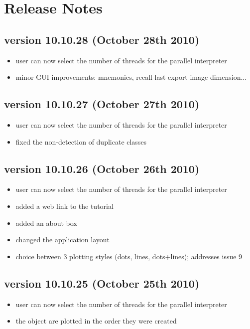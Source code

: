 \section{Release Notes}
\subsection{version 10.10.28 (October 28th 2010)}

\begin{itemize}
    \item user can now select the number of threads for the parallel interpreter
    \item minor GUI improvements: mnemonics, recall last export image dimension... 
\end{itemize}

\subsection{version 10.10.27 (October 27th 2010)}

\begin{itemize}
    \item user can now select the number of threads for the parallel interpreter
    \item fixed the non-detection of duplicate classes 
\end{itemize}

\subsection{version 10.10.26 (October 26th 2010)}

\begin{itemize}
    \item user can now select the number of threads for the parallel interpreter
    \item added a web link to the tutorial
    \item added an about box
    \item changed the application layout
    \item choice between 3 plotting styles (dots, lines, dots+lines); addresses  issue 9  
\end{itemize}

\subsection{version 10.10.25 (October 25th 2010)}

\begin{itemize}
    \item user can now select the number of threads for the parallel interpreter
    \item the object are plotted in the order they were created 
\end{itemize}

